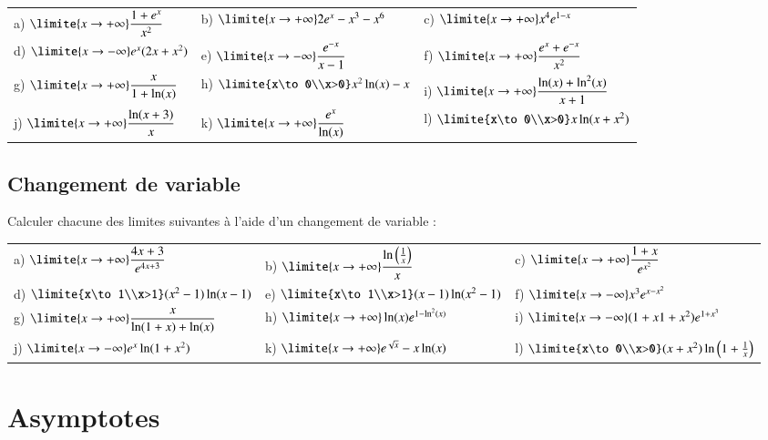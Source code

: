 \documentclass[oneside,12pt]{article}          %
\begin{document}
\begin{tabular}{p{} p{} p{}}
	a) $\limite{x\to+\infty} \dfrac{1+e^x}{x^2}$  &
	b) $\limite{x\to+\infty} 2e^x-x^3-x^6$ &
	c) $\limite{x\to+\infty} x^4e^{1-x}$ \\
	d) $\limite{x\to-\infty} e^x(2x+x^2)$ &
	e) $\limite{x\to-\infty} \dfrac{e^{-x}}{x-1}$ &
	f) $\limite{x\to+\infty} \dfrac{e^x+e^{-x}}{x^2}$ \\
	g) $\limite{x\to+\infty} \dfrac{x}{1+\ln(x)}$ &
	h) $\limite{x\to0\\x>0} x^2\ln(x)-x$ &
	i) $\limite{x\to+\infty} \dfrac{\ln(x)+\ln^2(x)}{x+1}$ \\
	j) $\limite{x\to+\infty} \dfrac{\ln(x+3)}{x}$ &
	k) $\limite{x\to+\infty} \dfrac{e^x}{\ln(x)}$ &
	l) $\limite{x\to0\\x>0} x\ln(x+x^2)$
\end{tabular}



\subsection{Changement de variable}
Calculer chacune des limites suivantes à l'aide d'un changement de variable :

\begin{tabular}{p{} p{} p{}}
	a) $\limite{x\to+\infty} \dfrac{4x+3}{e^{4x+3}}$  &
	b) $\limite{x\to+\infty} \dfrac{\ln\left(\frac{1}{x}\right)}{x}$ &
	c) $\limite{x\to+\infty} \dfrac{1+x}{e^{x^2}}$ \\
	d) $\limite{x\to1\\x>1} (x^2-1)\ln(x-1)$ &
	e) $\limite{x\to1\\x>1} (x-1)\ln(x^2-1)$ &
	f) $\limite{x\to-\infty} x^3e^{x-x^2}$ \\
	g) $\limite{x\to+\infty} \dfrac{x}{\ln(1+x)+\ln(x)}$ &
	h) $\limite{x\to+\infty} \ln(x)e^{1-\ln^2(x)}$ &
	i) $\limite{x\to-\infty} (1+x1+x^2)e^{1+x^3}$ \\
	j) $\limite{x\to-\infty} e^x\ln(1+x^2)$ &
	k) $\limite{x\to+\infty} e^{\sqrt{x}}-x\ln(x)$ &
	l) $\limite{x\to0\\x>0} (x+x^2)\ln\left(1+\frac{1}{x}\right)$
\end{tabular}



\section{Asymptotes}
\end{document}
